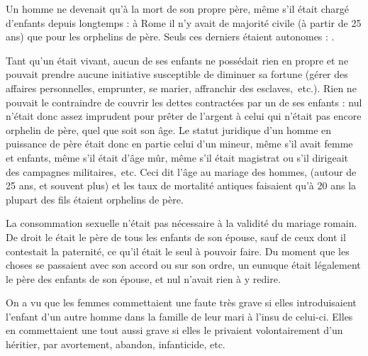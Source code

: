 Un homme ne devenait  qu'à la mort de son propre
père, même s'il était chargé d'enfants depuis longtemps : à Rome il n'y
avait de majorité civile (à partir de 25 ans) que pour les orphelins de père.
Seuls ces derniers étaient autonomes : .

Tant qu'un  était vivant, aucun de ses enfants ne possédait
rien en propre et ne pouvait prendre aucune initiative susceptible
de diminuer sa fortune (gérer des affaires personnelles, emprunter, se
marier, affranchir des esclaves,~etc.). Rien ne pouvait le contraindre de
couvrir les dettes contractées par un de ses enfants : nul n'était donc assez
imprudent pour prêter de l'argent à celui qui n'était pas encore orphelin
de père, quel que soit son âge. Le statut juridique d'un homme en
puissance de père était donc en partie celui d'un mineur, même s'il avait
femme et enfants, même s'il était d'âge mûr, même s'il était magistrat ou
s'il dirigeait des campagnes militaires,~etc. Ceci dit l'âge au mariage des
hommes, (autour de 25 ans, et souvent plus) et les taux de mortalité antiques
faisaient qu'à 20 ans la plupart des fils étaient orphelins de père.

La consommation sexuelle n'était pas nécessaire à la validité du
mariage romain. De droit le  était le père de tous les enfants
de son épouse, sauf de ceux dont il contestait la paternité, ce qu'il était le
seul à pouvoir faire. Du moment que les choses se passaient avec son accord
ou sur son ordre, un eunuque était légalement le père des enfants de
son épouse, et nul n'avait rien à y redire.

On a vu que les femmes commettaient une faute très grave si elles
introduisaient l'enfant d'un autre homme dans la famille de leur mari à
l'insu de celui-ci. Elles en commettaient une tout aussi grave si elles le
privaient volontairement d'un héritier, par avortement, abandon, infanticide,
etc.

